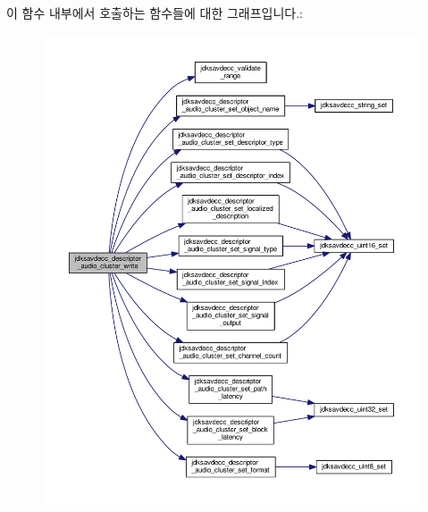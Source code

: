 이 함수 내부에서 호출하는 함수들에 대한 그래프입니다.\+:
\nopagebreak
\begin{figure}[H]
\begin{center}
\leavevmode
\includegraphics[width=350pt]{group__descriptor__audio__cluster_gae7c9d8c6719ffef0a968e0e175997687_cgraph}
\end{center}
\end{figure}


